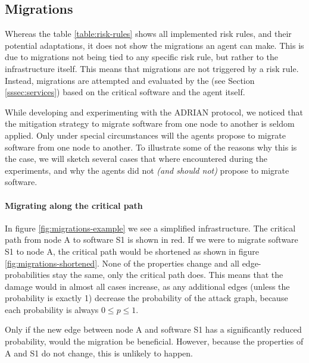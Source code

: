 \subsection{Migrations} 
\label{ssec:migrations}
Whereas the table \ref{table:risk-rules} shows all implemented risk rules, and their potential adaptations, it does not show the migrations an agent can make. This is due to migrations not being tied to any specific risk rule, but rather to the infrastructure itself. This means that migrations are not triggered by a risk rule. Instead, migrations are attempted and evaluated by the  (see Section \ref{sssec:services}) based on the critical software and the agent itself.

While developing and experimenting with the ADRIAN protocol, we noticed that the mitigation strategy to migrate software from one node to another is seldom applied. Only under special circumstances will the agents propose to migrate software from one node to another. To illustrate some of the reasons why this is the case, we will sketch several cases that where encountered during the experiments, and why the agents did not \emph{(and should not)} propose to migrate software.

\paragraph*{Migrating along the critical path}
In figure \ref{fig:migrations-example} we see a simplified infrastructure. The critical path from node A to software S1 is shown in red. If we were to migrate software S1 to node A, the critical path would be shortened as shown in figure \ref{fig:migrations-shortened}. None of the properties change and all edge-probabilities stay the same, only the critical path does. This means that the damage would in almost all cases increase, as any additional edges (unless the probability is exactly 1) decrease the probability of the attack graph, because each probability is always \(0 \leq p \leq 1\). 

Only if the new edge between node A and software S1 has a significantly reduced probability, would the migration be beneficial. However, because the properties of A and S1 do not change, this is unlikely to happen. 

